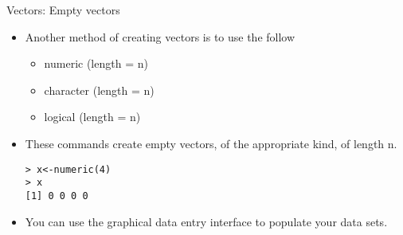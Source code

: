 \documentclass{beamer}
\begin{document}
\begin{frame}[fragile]{Vectors: Empty vectors}

\begin{itemize}
\item Another method of creating vectors is to use the follow

\begin{itemize}
\item numeric (length = n) \item character (length = n) \item
logical (length = n)\end{itemize}

\item These commands create empty vectors, of the appropriate
kind, of length n.

\begin{verbatim}
> x<-numeric(4)
> x
[1] 0 0 0 0
\end{verbatim}

\item You can use the graphical data entry interface to populate
your data sets.
\end{itemize}
\end{frame}
\end{document}
